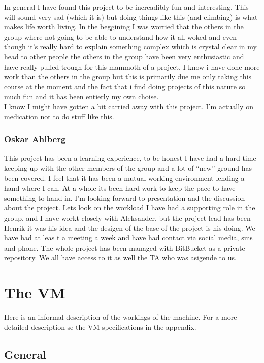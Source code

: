\documentclass{article}
\begin{document}
In general I have found this project to be increadibly fun and interesting.
This will sound very sad (which it is) but doing things like this (and climbing)
is what makes life worth living. In the beggining I was worried that the others
in the group where not going to be able to understand how it all woked and even
though it's really hard to explain something complex which is crystal clear in
my head to other people the others in
the group have been very enthusiastic and have really pulled trough for this
mammoth of a project. I know i have done more work than the others in the
group but this is primarily due me only taking this course at the moment and
the fact that i find doing projects of this nature so much fun and it has been entierly my own choise.
\\
I know I might have gotten a bit carried away with this project. I'm actually on
medication not to do stuff like this.

\subsubsection{Oskar Ahlberg}
This project has been a learning experience, to be honest I have had a hard time keeping up with the other
members of the group and a lot of ``new'' ground has been covered. I feel that
it has been a mutual working environment lending a hand where I can. At a whole its been hard work to keep the pace to have something to hand in.
I'm looking forward to presentation and the discussion about the project. Lets look on the workload
I have had a supporting role in the group, and I have workt closely with Aleksander, but the project lead
 has been Henrik it was his idea and the desigen of the base of the project is
 his doing. We have had at leas t a meeting a week and have had contact via
 social media, sms and phone. The whole project has been managed with BitBucket
 as a private repository. We all have access to it as well the TA who was
 asigende to us.

\section{The VM}
Here is an informal description of the workings of the machine. For a more
detailed description se the VM specifications in the appendix.
\subsection{General}
\end{document}
